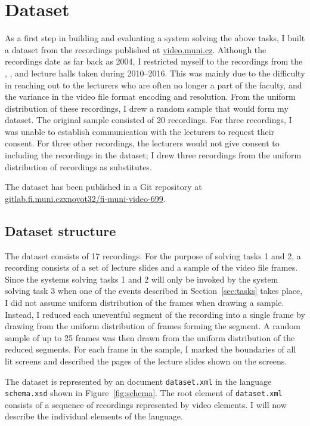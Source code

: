 \section{Dataset}
\label{sec:dataset}
As a first step in building and evaluating a system solving the above tasks, I
built a dataset from the recordings published at
\href{https://www.video.muni.cz}{video.muni.cz}.
Although the recordings date as far back as 2004, I restricted myself to the
recordings from the , , and  lecture halls taken
during 2010--2016. This was mainly due to the difficulty in reaching out to
the lecturers who are often no longer a part of the faculty, and the variance
in the video file format encoding and resolution. From the uniform distribution
of these recordings, I drew a random sample that would form my dataset.
The original sample consisted of 20 recordings. For three recordings, I was
unable to establish communication with the lecturers to request their consent.
For three other recordings, the lecturers would not give consent to including
the recordings in the dataset; I drew three recordings from the uniform
distribution of recordings as substitutes.

The dataset has been published in a Git repository at
\href{https://gitlab.fi.muni.cz/xnovot32/fi-muni-video-699}%
     {gitlab.fi.muni.cz\discretionary{/}{}{/}xnovot32/fi-muni-video-699}.

\subsection{Dataset structure}
The dataset consists of 17 recordings. For the purpose of solving tasks 1 and
2, a recording consists of a set of lecture slides and a sample of the video
file frames. Since the systems solving tasks 1 and 2 will only be invoked by
the system solving task 3 when one of the events described in
Section~\ref{sec:tasks} takes place, I did not assume uniform distribution of
the frames when drawing a sample. Instead, I reduced each uneventful segment of
the recording into a single frame by drawing from the uniform distribution of
frames forming the segment. A random sample of up to 25 frames was then drawn
from the uniform distribution of the reduced segments. For each frame in the
sample, I marked the boundaries of all lit screens and described the pages of
the lecture slides shown on the screens.

The dataset is represented by an  document \texttt{dataset.xml} in
the language \texttt{schema.xsd} shown in Figure~\ref{fig:schema}. The root
element of \texttt{dataset.xml} consists of a sequence of recordings
represented by video elements. I will now describe the individual elements of
the language.

